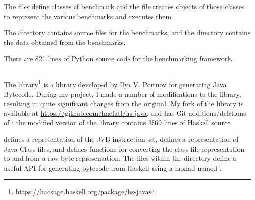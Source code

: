 \documentclass[dissertation.tex]{subfiles}
\begin{document}
{{        The  files define classes of benchmark and the  file creates objects of those classes to represent the various benchmarks and executes them.

        The  directory contains source files for the benchmarks, and the  directory contains the data obtained from the benchmarks.

        There are 821 lines of Python source code for the benchmarking framework.
    }
    \subsection{}
    {
        The  library\footnote{\url{https://hackage.haskell.org/package/hs-java}} is a library developed by Ilya V. Portnov for generating Java Bytecode. During my project, I made a number of modifications to the library, resulting in quite significant changes from the original. My fork of the library is available at \url{https://github.com/hnefatl/hs-java}, and has Git additions/deletions of : the modified version of the library contains 3569 lines of Haskell source.

         defines a representation of the JVB instruction set,  defines a representation of Java Class files, and  defines functions for converting the class file representation to and from a raw byte representation. The files within the  directory define a useful API for generating bytecode from Haskell using a monad named .
    }
}
\end{document}
